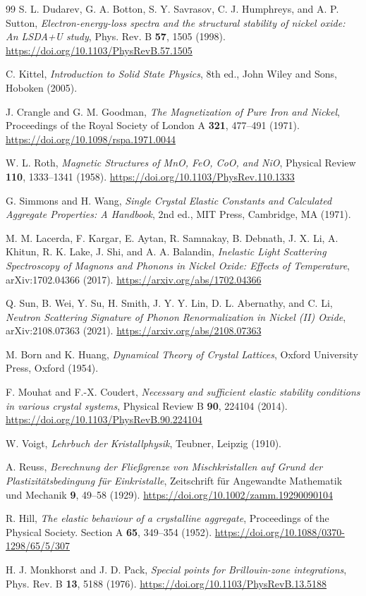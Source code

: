 \documentclass[12pt,a4paper]{article}
\begin{document}
\begin{thebibliography}{99}
S. L. Dudarev, G. A. Botton, S. Y. Savrasov, C. J. Humphreys, and A. P. Sutton,
\emph{Electron-energy-loss spectra and the structural stability of nickel oxide:
An LSDA+U study}, Phys. Rev. B \textbf{57}, 1505 (1998).
\url{https://doi.org/10.1103/PhysRevB.57.1505}

C. Kittel, \emph{Introduction to Solid State Physics}, 8th ed.,
John Wiley and Sons, Hoboken (2005).

J. Crangle and G. M. Goodman,
\emph{The Magnetization of Pure Iron and Nickel},
Proceedings of the Royal Society of London A \textbf{321}, 477--491 (1971).
\url{https://doi.org/10.1098/rspa.1971.0044}

W. L. Roth,
\emph{Magnetic Structures of MnO, FeO, CoO, and NiO},
Physical Review \textbf{110}, 1333--1341 (1958).
\url{https://doi.org/10.1103/PhysRev.110.1333}

G. Simmons and H. Wang,
\emph{Single Crystal Elastic Constants and Calculated Aggregate Properties:
A Handbook}, 2nd ed., MIT Press, Cambridge, MA (1971).

M. M. Lacerda, F. Kargar, E. Aytan, R. Samnakay, B. Debnath, J. X. Li,
A. Khitun, R. K. Lake, J. Shi, and A. A. Balandin,
\emph{Inelastic Light Scattering Spectroscopy of Magnons and Phonons in Nickel
Oxide: Effects of Temperature}, arXiv:1702.04366 (2017).
\url{https://arxiv.org/abs/1702.04366}

Q. Sun, B. Wei, Y. Su, H. Smith, J. Y. Y. Lin, D. L. Abernathy, and C. Li,
\emph{Neutron Scattering Signature of Phonon Renormalization in Nickel (II)
Oxide}, arXiv:2108.07363 (2021).
\url{https://arxiv.org/abs/2108.07363}

M. Born and K. Huang,
\emph{Dynamical Theory of Crystal Lattices},
Oxford University Press, Oxford (1954).

F. Mouhat and F.-X. Coudert,
\emph{Necessary and sufficient elastic stability conditions in various crystal
systems}, Physical Review B \textbf{90}, 224104 (2014).
\url{https://doi.org/10.1103/PhysRevB.90.224104}

W. Voigt,
\emph{Lehrbuch der Kristallphysik},
Teubner, Leipzig (1910).

A. Reuss,
\emph{Berechnung der Flie{\ss}grenze von Mischkristallen auf Grund der
Plastizit{\"a}tsbedingung f{\"u}r Einkristalle},
Zeitschrift f{\"u}r Angewandte Mathematik und Mechanik \textbf{9}, 49--58
(1929).
\url{https://doi.org/10.1002/zamm.19290090104}

R. Hill,
\emph{The elastic behaviour of a crystalline aggregate},
Proceedings of the Physical Society. Section A \textbf{65}, 349--354 (1952).
\url{https://doi.org/10.1088/0370-1298/65/5/307}

H. J. Monkhorst and J. D. Pack,
\emph{Special points for Brillouin-zone integrations},
Phys. Rev. B \textbf{13}, 5188 (1976).
\url{https://doi.org/10.1103/PhysRevB.13.5188}

\end{thebibliography}
\end{document}
